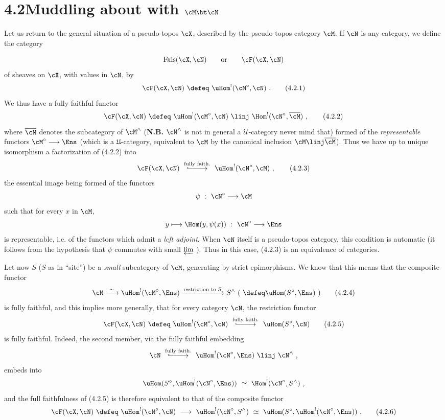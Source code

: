 \section*{4.2\quad Muddling about with $\cM \bt \cN$}

Let us return to the general situation of a pseudo-topos $\cX$, described by the pseudo-topos category $\cM$. If $\cN$ is any category, we define the category

\[
\mathrm{Fais}(\cX,\cN) \qquad \text{or} \qquad \cF(\cX,\cN)
\]
of sheaves on $\cX$, with values in $\cN$, by
\[
\cF(\cX,\cN) \ \defeq\ \uHom^{!}(\cM^{\circ},\cN) \ .
\tag*{(4.2.1)}
\]
We thus have a fully faithful functor
\[
\cF(\cX,\cN) \ \defeq\ \uHom^{!}(\cM^{\circ},\cN) \ \linj\ \Hom^{!}(\cN^{\circ},\overline{\cM}) \ ,
\tag*{(4.2.2)}
\]
where $\overline{\cM}$ denotes the subcategory of $\cM^{\wedge}$ (\textbf{N.B.} $\cM^{\wedge}$ is not in general a $\mathcal{U}$-category never mind that) formed of the \textit{representable} functors $\cM^{\circ}\longrightarrow\Ens$ (which is a $\mathfrak{U}$-category, equivalent to $\cM$ by the canonical inclusion $\cM \linj \overline{\cM}$). Thus we have up to unique isomorphism a factorization of (4.2.2) into
\[
\cF(\cX,\cN) \ \overset{\text{fully faith.}}{\lhook\joinrel\relbar\joinrel\relbar\joinrel\longrightarrow}\ \uHom^{!}(\cN^{\circ},\cM) \ ,
\tag*{(4.2.3)}
\]
the essential image being formed of the functors
\[
\psi \ :\ \cN^{\circ} \longrightarrow \cM
\]
such that for every $x$ in $\cM$,
\[
y \longmapsto \Hom(y,\psi(x)) \ :\ \cN^{\circ} \longrightarrow \Ens
\]
is representable, i.e. of the functors which
admit a \textit{left adjoint}. When $\cN$ itself is a pseudo-topos category, this condition is automatic (it follows from the hypothesis that $\psi$ commutes with small $\varprojlim$ ). Thus in this case, (4.2.3) is an equivalence of categories.

Let now $S$ ($S$ as in ``site'') be a \textit{small} subcategory of $\cM$, generating by strict epimorphisms. We know that this means that the composite functor
\[
\cM \xrightarrow{\ \sim\ } \uHom^{!}(\cM^{\circ},\Ens) \xrightarrow{\text{restriction to } S} S^{\wedge} \ (\ \defeq \uHom(S^{\circ},\Ens)\ )
\tag*{(4.2.4)}
\]
is fully faithful, and this implies more generally, that for every category $\cN$, the restriction functor
\[
\cF(\cX,\cN) \ \defeq\ \uHom^{!}(\cM^{\circ},\cN) \ \overset{\text{fully faith.}}{\lhook\joinrel\relbar\joinrel\relbar\joinrel\longrightarrow}\ \uHom(S^{\circ},\cN)
\tag*{(4.2.5)}
\]
is fully faithful. Indeed, the second member, via the fully faithful embedding
\[
\cN \ \overset{\text{fully faith.}}{\lhook\joinrel\relbar\joinrel\relbar\joinrel\longrightarrow}\ \uHom^{!}(\cN^{\circ},\Ens) \ \linj\ \cN^{\wedge} \ ,
\]
embeds into
\[
\uHom(S^{\circ},\uHom^{!}(\cN^{\circ},\Ens)) \ \simeq\ \Hom^{!}(\cN^{\circ},S^{\wedge}) \ ,
\]
and the full faithfulness of (4.2.5) is therefore equivalent to that of the composite functor
\[
\cF(\cX,\cN) \ \defeq\ \uHom^{!}(\cM^{\circ},\cN) \ \longrightarrow\ \uHom^{!}(\cN^{\circ},S^{\wedge}) \ \simeq\ \uHom(S^{\circ},\uHom^{!}(\cN^{\circ},\Ens)) \ .
\tag*{(4.2.6)}
\]

